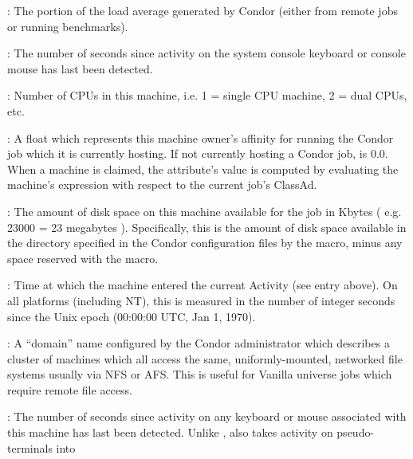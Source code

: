 \begin{description}
%
\item[\AdAttr{CondorLoadAvg}] : The portion of the load average generated by Condor (either
from remote jobs or running benchmarks).
%
\item[\AdAttr{ConsoleIdle}] : The number of seconds since activity on the system
console keyboard or console mouse has last been detected.
%
\item[\AdAttr{Cpus}] : Number of CPUs in this machine, i.e. 1 = single CPU machine, 2 = dual
CPUs, etc.
%
\item[\AdAttr{CurrentRank}] : A float which represents this machine
owner's affinity
for running the Condor job which it is currently hosting.  If not
currently hosting a Condor job,  is 0.0.
When a machine is claimed,
the attribute's value is computed by evaluating the machine's
 expression with respect to the current job's ClassAd.
%
\item[\AdAttr{Disk}] : The amount of disk space on this machine available for
the job in Kbytes ( e.g. 23000 = 23 megabytes ).  Specifically, this
is the amount of disk space available in the directory specified in
the Condor configuration files by the  macro, minus any
space reserved with the  macro.
%
\item[\AdAttr{EnteredCurrentActivity}] : Time at which the machine
entered the current Activity (see  entry above).  On
all platforms (including NT), this is measured in the number of
integer seconds since the Unix epoch (00:00:00 UTC, Jan 1, 1970).
%
\item[\AdAttr{FileSystemDomain}] : A ``domain'' name configured by the
Condor administrator which describes a cluster of machines which all
access the same, uniformly-mounted, networked file systems usually via
NFS or AFS.  This is useful for Vanilla universe jobs which require
remote file access.
%
\item[\AdAttr{KeyboardIdle}] : The number of seconds since activity on any
keyboard or mouse associated with this machine has last been detected.
Unlike ,  also takes activity 
on pseudo-terminals into

\end{description}

